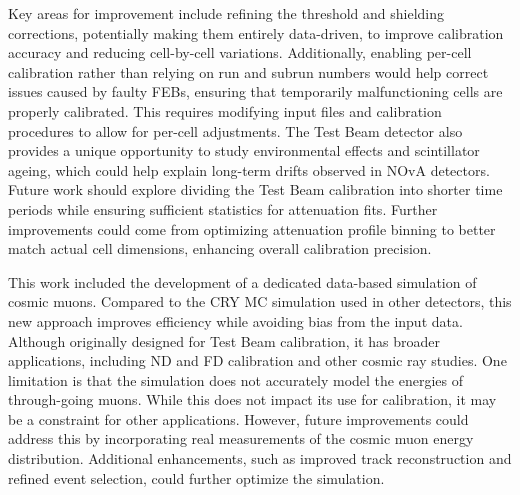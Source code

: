 Key areas for improvement include refining the threshold and shielding corrections, potentially making them entirely data-driven, to improve calibration accuracy and reducing cell-by-cell variations. Additionally, enabling per-cell calibration rather than relying on run and subrun numbers would help correct issues caused by faulty \glspl{FEB}, ensuring that temporarily malfunctioning cells are properly calibrated. This requires modifying input files and calibration procedures to allow for per-cell adjustments. The Test Beam detector also provides a unique opportunity to study environmental effects and scintillator ageing, which could help explain long-term drifts observed in \gls{NOvA} detectors. Future work should explore dividing the Test Beam calibration into shorter time periods while ensuring sufficient statistics for attenuation fits. Further improvements could come from optimizing attenuation profile binning to better match actual cell dimensions, enhancing overall calibration precision.

This work included the development of a dedicated data-based simulation of cosmic muons. Compared to the \gls{CRY} \gls{MC} simulation used in other detectors, this new approach improves efficiency while avoiding bias from the input data. Although originally designed for Test Beam calibration, it has broader applications, including \gls{ND} and \gls{FD}  calibration and other cosmic ray studies. One limitation is that the simulation does not accurately model the energies of through-going muons. While this does not impact its use for calibration, it may be a constraint for other applications. However, future improvements could address this by incorporating real measurements of the cosmic muon energy distribution. Additional enhancements, such as improved track reconstruction and refined event selection, could further optimize the simulation.